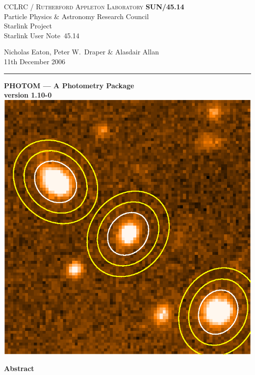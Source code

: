 \documentclass[twoside,11pt]{article}
\newcommand{\stardoccategory}  {Starlink User Note}
\newcommand{\stardocinitials}  {SUN}
\newcommand{\stardocnumber}    {45.14}
\newcommand{\stardocauthors}   {Nicholas Eaton, Peter W.\ Draper \& Alasdair Allan}
\newcommand{\stardocdate}      {11th December 2006}
\newcommand{\stardoctitle}     {PHOTOM --- A Photometry Package }
\newcommand{\stardocversion}   {version 1.10-0}
\newcommand{\stardocname}{\stardocinitials /\stardocnumber}
\newenvironment{latexonly}{}{}
\renewcommand{\_}{\texttt{\symbol{95}}}
\begin{document}
\thispagestyle{empty}

\begin{latexonly}
   CCLRC / \textsc{Rutherford Appleton Laboratory} \hfill \textbf{\stardocname}\\
   {\large Particle Physics \& Astronomy Research Council}\\
   {\large Starlink Project\\}
   {\large \stardoccategory\ \stardocnumber}
   \begin{flushright}
   \stardocauthors\\
   \stardocdate
   \end{flushright}
   \vspace{-4mm}
   \rule{\textwidth}{0.5mm}
   \vspace{5mm}
   \begin{center}
   {\LARGE\bf  \stardoctitle \\ [2.5ex]}
   {\Large\bf  \stardocversion \\ [4ex]}
   \includegraphics{sun45fig.ps}
   \end{center}
   \vspace{5mm}


   \vspace{10mm}
   \begin{center}
      {\Large\textbf{Abstract}}
   \end{center}
\end{latexonly}
\end{document}
